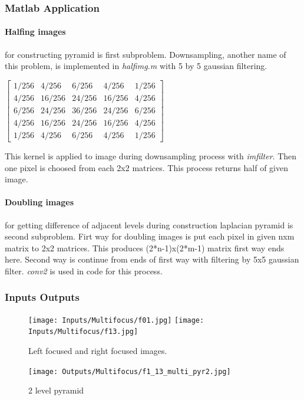 \documentclass[12pt]{article}
\begin{document}
\subsubsection{Matlab Application}
\paragraph{Halfing images} for constructing pyramid is first subproblem. Downsampling, another name of this problem, is implemented in \textit{halfimg.m} with 5 by 5 gaussian filtering. 

\begin{center}
$\left[ \begin{matrix}	
    1/256 & 4/256 & 6/256 & 4/256 & 1/256\\
    4/256 & 16/256 & 24/256 & 16/256 & 4/256 \\
    6/256 & 24/256 & 36/256 & 24/256 & 6/256 \\
    4/256 & 16/256 & 24/256 & 16/256 & 4/256 \\
    1/256 & 4/256 & 6/256 & 4/256 & 1/256 
 \end{matrix} \right]$ 
\end{center}
This kernel is applied to image during downsampling process with \textit{imfilter}. Then one pixel is choosed from each 2x2 matrices. This process returns half of given image. 
\paragraph{Doubling images}for getting difference of adjacent levels during construction laplacian pyramid  is second subproblem. Firt way for doubling images is put each pixel in given nxm matrix to 2x2 matrices. This produces (2*n-1)x(2*m-1) matrix first way ends here. Second way is continue from ends of first way with filtering by 5x5 gaussian filter. \textit{conv2} is used in code for this process.
\subsubsection{Inputs Outputs}

\begin{figure}[H]
\texttt{[image: Inputs/Multifocus/f01.jpg]}
\texttt{[image: Inputs/Multifocus/f13.jpg]}
\caption{Left focused and right focused images.}
\end{figure}


\begin{figure}[H]
\centering
\texttt{[image: Outputs/Multifocus/f1\_13\_multi\_pyr2.jpg]}
\caption{2 level pyramid}
\end{figure}
\end{document}
